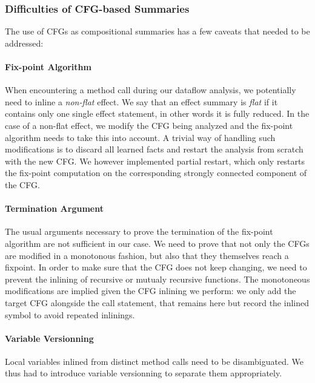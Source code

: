 \documentclass[a4paper]{article}
\begin{document}
\subsubsection{Difficulties of CFG-based Summaries}

The use of CFGs as compositional summaries has a few caveats that needed to be
addressed:

\paragraph{Fix-point Algorithm} When encountering a method call during our
dataflow analysis, we potentially need to inline a \emph{non-flat} effect.
We say that an effect summary is \emph{flat} if it contains only one single
effect statement, in other words it is fully reduced. In the case of a non-flat
effect, we modify the CFG being analyzed and the fix-point algorithm needs to
take this into account. A trivial way of handling such modifications is to
discard all learned facts and restart the analysis from scratch with the new
CFG. We however implemented partial restart, which only restarts the fix-point
computation on the corresponding strongly connected component of the CFG.

\paragraph{Termination Argument} The usual arguments necessary to prove the
termination of the fix-point algorithm are not sufficient in our case. We need
to prove that not only the CFGs are modified in a monotonous fashion, but also
that they themselves reach a fixpoint. In order to make sure that the CFG does
not keep changing, we need to prevent the inlining of recursive or mutualy
recursive functions. The monotoneous modifications are implied given the
CFG inlining we perform: we only add the target CFG alongside the call
statement, that remains here but record the inlined symbol to avoid repeated
inlinings.

\paragraph{Variable Versionning} Local variables inlined from distinct method
calls need to be disambiguated. We thus had to introduce variable versionning
to separate them appropriately.
\end{document}

